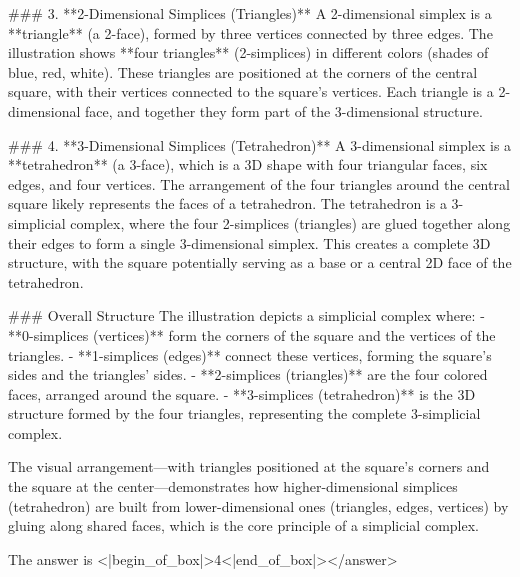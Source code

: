 ### 3. **2-Dimensional Simplices (Triangles)**  
A 2-dimensional simplex is a **triangle** (a 2-face), formed by three vertices connected by three edges. The illustration shows **four triangles** (2-simplices) in different colors (shades of blue, red, white). These triangles are positioned at the corners of the central square, with their vertices connected to the square’s vertices. Each triangle is a 2-dimensional face, and together they form part of the 3-dimensional structure.    

### 4. **3-Dimensional Simplices (Tetrahedron)**  
A 3-dimensional simplex is a **tetrahedron** (a 3-face), which is a 3D shape with four triangular faces, six edges, and four vertices. The arrangement of the four triangles around the central square likely represents the faces of a tetrahedron. The tetrahedron is a 3-simplicial complex, where the four 2-simplices (triangles) are glued together along their edges to form a single 3-dimensional simplex. This creates a complete 3D structure, with the square potentially serving as a base or a central 2D face of the tetrahedron.    


### Overall Structure  
The illustration depicts a simplicial complex where:  
- **0-simplices (vertices)** form the corners of the square and the vertices of the triangles.  
- **1-simplices (edges)** connect these vertices, forming the square’s sides and the triangles’ sides.  
- **2-simplices (triangles)** are the four colored faces, arranged around the square.  
- **3-simplices (tetrahedron)** is the 3D structure formed by the four triangles, representing the complete 3-simplicial complex.  

The visual arrangement—with triangles positioned at the square’s corners and the square at the center—demonstrates how higher-dimensional simplices (tetrahedron) are built from lower-dimensional ones (triangles, edges, vertices) by gluing along shared faces, which is the core principle of a simplicial complex.  

The answer is <|begin_of_box|>4<|end_of_box|></answer>